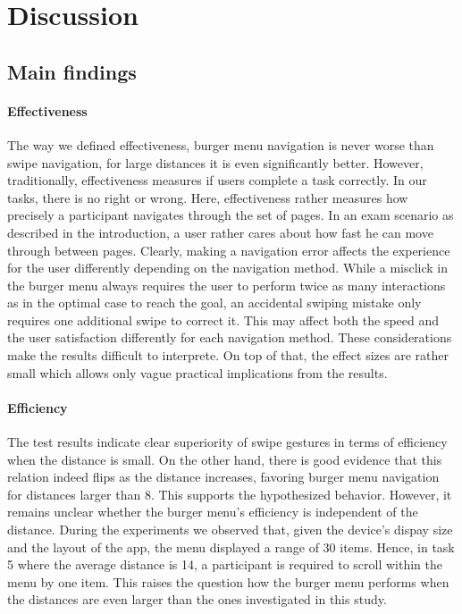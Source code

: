 \documentclass{sig-alternate-05-2015}
\begin{document}
\section{Discussion}
\subsection{Main findings}
\paragraph{Effectiveness}
The way we defined effectiveness, burger menu navigation is never worse than swipe navigation, for large distances it is even significantly better. However,
traditionally, effectiveness measures if users complete a task correctly. In our tasks, there is no right or wrong. Here, effectiveness rather measures 
how precisely a participant navigates through the set of pages. In an exam scenario as described in the introduction, a user rather cares about
how fast he can move through between pages. Clearly, making a navigation error affects the experience for the user differently depending on the navigation method.
While a misclick in the burger menu always requires the user to perform twice as many interactions as in the optimal case to reach the goal, an accidental
swiping mistake only requires one additional swipe to correct it. This may affect both the speed and the user satisfaction differently for each navigation method.
These considerations make the results difficult to interprete. On top of that, the effect sizes are rather small which allows only vague practical implications
from the results.
\paragraph{Efficiency}
The test results indicate clear superiority of swipe gestures in terms of efficiency when the distance is small. On the other hand, there is good evidence that
this relation indeed flips as the distance increases, favoring burger menu navigation for distances larger than 8. This supports the hypothesized behavior. However,
it remains unclear whether the burger menu's efficiency is independent of the distance. During the experiments we observed that, given the device's dispay size and the layout of
the app, the menu displayed a range of 30 items. Hence, in task 5 where the average distance is 14, a participant is required to scroll within the menu by one item.
This raises the question how the burger menu performs when the distances are even larger than the ones investigated in this study.
\end{document}
